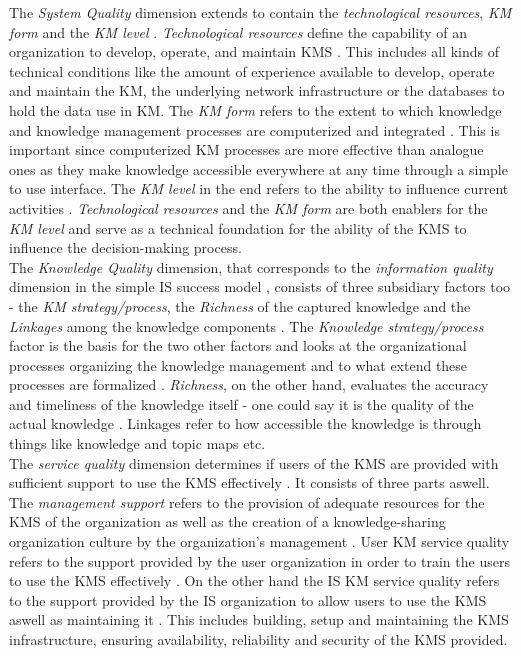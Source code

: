 \documentclass[
	english,
	ruledheaders=section,%
	class=report,%
	thesis={type=bachelor},%
	accentcolor=1b,%
	custommargins=true,%
	marginpar=false,%
	parskip=half-,%
	fontsize=11pt,%
	DIV=14,
]{tudapub}
\begin{document}
The \textit{System Quality} dimension extends to contain the \textit{technological resources}, \textit{KM form} and the \textit{KM level} \parencite[p.~56]{Jennex2006}. \textit{Technological resources} define the capability of an organization to develop, operate, and maintain KMS \parencite[p.~56]{Jennex2006}. This includes all kinds of technical conditions like the amount of experience available to develop, operate and maintain the KM, the underlying network infrastructure or the databases to hold the data use in KM. The \textit{KM form} refers to the extent to which knowledge and knowledge management processes are computerized and integrated \parencite[p.~56]{Jennex2006}. This is important since computerized KM processes are more effective than analogue ones as they make knowledge accessible everywhere at any time through a simple to use interface. The \textit{KM level} in the end refers to the ability to influence current activities \parencite[p.~57]{Jennex2006}. \textit{Technological resources} and the \textit{KM form} are both enablers for the \textit{KM level} and serve as a technical foundation for the ability of the KMS to influence the decision-making process.\\
The \textit{Knowledge Quality} dimension, that corresponds to the \textit{information quality} dimension in the simple IS success model \parencite[~p.~64]{DeloneMcLean2003ISSuccessTenYearUpdate}, consists of three subsidiary factors too - the \textit{KM strategy/process}, the \textit{Richness} of the captured knowledge and the \textit{Linkages} among the knowledge components \parencite[p.~57]{Jennex2006}. The \textit{Knowledge strategy/process} factor is the basis for the two other factors and looks at the organizational processes organizing the knowledge management and to what extend these processes are formalized \parencite[p.~57]{Jennex2006}. \textit{Richness}, on the other hand, evaluates the accuracy and timeliness of the knowledge itself - one could say it is the quality of the actual knowledge \parencite[p.~57]{Jennex2006}. Linkages refer to how accessible the knowledge is through things like knowledge and topic maps etc. \parencite[p.~57]{Jennex2006}\\
The \textit{service quality} dimension determines if users of the KMS are provided with sufficient support to use the KMS effectively \parencite[p.~58]{Jennex2006}. It consists of three parts aswell. The \textit{management support} refers to the provision of adequate resources for the KMS of the organization as well as the creation of a knowledge-sharing organization culture by the organization's management \parencite[p.~58]{Jennex2006}. User KM service quality refers to the support provided by the user organization in order to train the users to use the KMS effectively \parencite[p.~58]{Jennex2006}. On the other hand the IS KM service quality refers to the support provided by the IS organization to allow users to use the KMS aswell as maintaining it \parencite[p.~59]{Jennex2006}. This includes building, setup and maintaining the KMS infrastructure, ensuring availability, reliability and security of the KMS provided.\\\\
\end{document}
